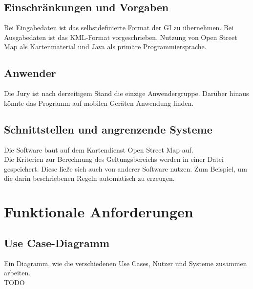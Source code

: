 \subsection{Einschränkungen und Vorgaben}
Bei Eingabedaten ist das selbstdefinierte Format der GI zu übernehmen. Bei Ausgabedaten ist das KML-Format vorgeschrieben. 
Nutzung von Open Street Map als Kartenmaterial und Java als primäre Programmiersprache.
\subsection{Anwender}
Die Jury ist nach derzeitigem Stand die einzige Anwendergruppe. Darüber hinaus könnte das Programm auf mobilen Geräten Anwendung finden.
\subsection{Schnittstellen und angrenzende Systeme}
Die Software baut auf dem Kartendienst Open Street Map auf.\\
Die Kriterien zur Berechnung des Geltungsbereichs werden in einer Datei gespeichert. Diese ließe sich auch von anderer Software nutzen.
Zum Beispiel, um die darin beschriebenen Regeln automatisch zu erzeugen.
\section{Funktionale Anforderungen}
\subsection{Use Case-Diagramm}
Ein Diagramm, wie die verschiedenen Use Cases, Nutzer und Systeme zusammen arbeiten.\\
TODO

